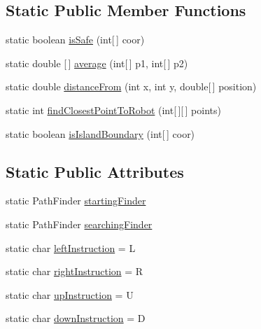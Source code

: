\subsection*{Static Public Member Functions}
\begin{DoxyCompactItemize}
\item 
static boolean \hyperlink{classca_1_1mcgill_1_1ecse211_1_1project_1_1_game_util_a4b657445545fb1a814b6699724d72042}{is\+Safe} (int\mbox{[}$\,$\mbox{]} coor)
\item 
static double \mbox{[}$\,$\mbox{]} \hyperlink{classca_1_1mcgill_1_1ecse211_1_1project_1_1_game_util_ae5c5c445ab84516991219ca3783fcaa4}{average} (int\mbox{[}$\,$\mbox{]} p1, int\mbox{[}$\,$\mbox{]} p2)
\item 
static double \hyperlink{classca_1_1mcgill_1_1ecse211_1_1project_1_1_game_util_a6fb324a3d5e42414c83dfd8bd5910b56}{distance\+From} (int x, int y, double\mbox{[}$\,$\mbox{]} position)
\item 
static int \hyperlink{classca_1_1mcgill_1_1ecse211_1_1project_1_1_game_util_a6e0ee94b800ca3727ca8009782abda14}{find\+Closest\+Point\+To\+Robot} (int\mbox{[}$\,$\mbox{]}\mbox{[}$\,$\mbox{]} points)
\item 
static boolean \hyperlink{classca_1_1mcgill_1_1ecse211_1_1project_1_1_game_util_a5783c3415e13b66362a647504b63741a}{is\+Island\+Boundary} (int\mbox{[}$\,$\mbox{]} coor)
\end{DoxyCompactItemize}
\subsection*{Static Public Attributes}
\begin{DoxyCompactItemize}
\item 
static Path\+Finder \hyperlink{classca_1_1mcgill_1_1ecse211_1_1project_1_1_game_util_a84ec23eabf60cb20895815e7b390e3f2}{starting\+Finder}
\item 
static Path\+Finder \hyperlink{classca_1_1mcgill_1_1ecse211_1_1project_1_1_game_util_acedc99ad369450d6b2d7711c2d63027a}{searching\+Finder}
\item 
static char \hyperlink{classca_1_1mcgill_1_1ecse211_1_1project_1_1_game_util_ab171328c45ccc1d98d96cc9422232669}{left\+Instruction} = \textquotesingle{}L\textquotesingle{}
\item 
static char \hyperlink{classca_1_1mcgill_1_1ecse211_1_1project_1_1_game_util_a4f6944d94b8de443baa150a2e7b700a0}{right\+Instruction} = \textquotesingle{}R\textquotesingle{}
\item 
static char \hyperlink{classca_1_1mcgill_1_1ecse211_1_1project_1_1_game_util_a98831b92dc6ed43627755d2995cba683}{up\+Instruction} = \textquotesingle{}U\textquotesingle{}
\item 
static char \hyperlink{classca_1_1mcgill_1_1ecse211_1_1project_1_1_game_util_afc9ecf0a8a18c0abea79086801d8425a}{down\+Instruction} = \textquotesingle{}D\textquotesingle{}
\end{DoxyCompactItemize}


